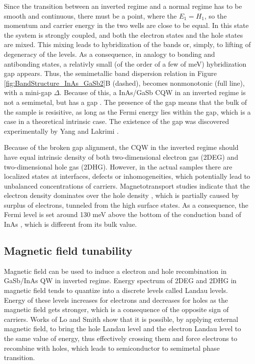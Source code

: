 \documentclass[titlepage,a4paper]{book}
\begin{document}
Since the transition between an inverted regime and a normal regime has to be smooth and continuous, there must be a point, where the $E_1 = H_1$, so the momentum and carrier energy in the two wells are close to be equal. In this state the system is strongly coupled, and both the electron states and the hole states are mixed. This mixing leads to hybridization of the bands or, simply, to lifting of degeneracy of the levels. As a consequence, in analogy to bonding and antibonding states, a relativly small (of the order of a few of meV) hybridization gap appears. Thus, the semimetallic band dispersion relation in Figure \ref{fig:BandStructure_InAs_GaSb2}B (dashed), becomes nonmonotonic (full line), with a mini-gap $\Delta$. Because of this, a InAs/GaSb CQW in an inverted regime is not a semimetal, but has a gap \cite{Altarelli_BandStructure}. The presence of the gap means that the bulk of the sample is resisitive, as long as the Fermi energy lies within the gap, which is a case in a theoretical intrinsic case. The existence of the gap was discovered experimentally by Yang \cite{Yang_BandStructure} and Lakrimi \cite{Lakrimi_BandStructure}.

Because of the broken gap alignment, the CQW in the inverted regime should have equal intrinsic density of both two-dimensional electron gas (2DEG) and two-dimensional hole gas (2DHG). However, in the actual samples there are localized states at interfaces, defects or inhomogeneities, which potentially lead to unbalanced concentrations of carriers. Magnetotransport studies indicate that the electron density dominates over the hole density \cite{Petchsingh_BandOrdering}\cite{Munekata_BandOrdering}, which is partially caused by surplus of electrons, tunneled from the high surface states. As a consequence, the Fermi level is set around 130 meV above the bottom of the conduction band of InAs \cite{Nguyen_Mobility}, which is different from its bulk value.

\subsection{Magnetic field tunability}
Magnetic field can be used to induce a electron and hole recombination in GaSb/InAs QW in inverted regime. Energy spectrum of 2DEG and 2DHG in magnetic field tends to quantize into a discrete levels called Landau levels. Energy of these levels increases for electrons and decreases for holes as the magnetic field gets stronger, which is a consequence of the opposite sign of carriers. Works of Lo \cite{Lo_MagneticField} and Smith \cite{Smith_MagneticField} show that it is possible, by applying external magnetic field, to bring the hole Landau level and the electron Landau level to the same value of energy, thus effectively crossing them and force electrons to recombine with holes, which leads to semiconductor to semimetal phase transition.
\end{document}
